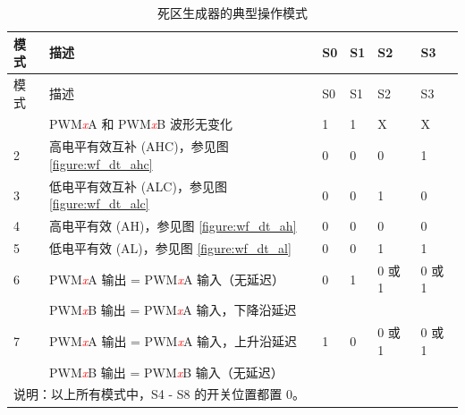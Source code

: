 
\begin{longtable}[c]{ |p{1cm}|p{8cm}|p{1cm}|p{1cm}|p{1cm}|p{1cm}|}
    \caption{死区生成器的典型操作模式}
    \label{table:mod_dt}
    \\\hline
    \rowcolor{lightgray}
   模式
    & 描述
    & S0
    & S1
    & S2
    & S3
    \\\hline
    \endfirsthead
    \hline
    \rowcolor{lightgray}   
   模式
    & 描述
    & S0
    & S1
    & S2
    & S3
    \\\hline
    \endhead
    \hline
    \endfoot
    1
    & PWM\textcolor{red}{\it{x}}A 和 PWM\textcolor{red}{\it{x}}B 波形无变化
    & 1
    & 1
    & X
    & X
    \\\hline
    2
    & 高电平有效互补 (AHC)，参见图 \ref{figure:wf_dt_ahc}
    & 0
    & 0
    & 0
    & 1
    \\\hline
    3
    & 低电平有效互补 (ALC)，参见图 \ref{figure:wf_dt_alc}
    & 0
    & 0
    & 1
    & 0
    \\\hline
    4
    & 高电平有效 (AH)，参见图 \ref{figure:wf_dt_ah}
    & 0
    & 0
    & 0
    & 0
    \\\hline
    5
    & 低电平有效 (AL)，参见图 \ref{figure:wf_dt_al}
    & 0
    & 0
    & 1
    & 1
    \\\hline
    6
    & PWM\textcolor{red}{\it{x}}A 输出 = PWM\textcolor{red}{\it{x}}A 输入（无延迟）
    & 0
    & 1
    & 0 或 1
    & 0 或 1 \\
    & PWM\textcolor{red}{\it{x}}B 输出 = PWM\textcolor{red}{\it{x}}A 输入，下降沿延迟&&&&
    \\\hline
    7
    & PWM\textcolor{red}{\it{x}}A 输出 = PWM\textcolor{red}{\it{x}}A 输入，上升沿延迟
    & 1
    & 0
    & 0 或 1
    & 0 或 1\\
    & PWM\textcolor{red}{\it{x}}B 输出 = PWM\textcolor{red}{\it{x}}B 输入（无延迟） &&&&
    \\\hline
    \multicolumn{6}{|l|}{说明：以上所有模式中，S4 - S8 的开关位置都置 0。}
\end{longtable}